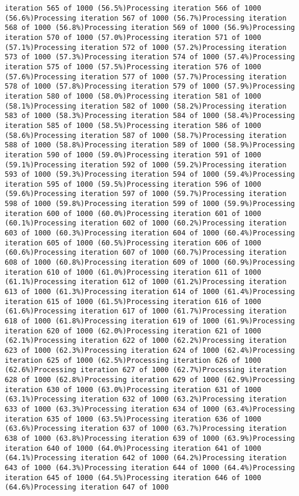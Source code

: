 \documentclass[
]{article}
\begin{document}
\begin{verbatim}
iteration 565 of 1000 (56.5%)Processing iteration 566 of 1000 (56.6%)Processing iteration 567 of 1000 (56.7%)Processing iteration 568 of 1000 (56.8%)Processing iteration 569 of 1000 (56.9%)Processing iteration 570 of 1000 (57.0%)Processing iteration 571 of 1000 (57.1%)Processing iteration 572 of 1000 (57.2%)Processing iteration 573 of 1000 (57.3%)Processing iteration 574 of 1000 (57.4%)Processing iteration 575 of 1000 (57.5%)Processing iteration 576 of 1000 (57.6%)Processing iteration 577 of 1000 (57.7%)Processing iteration 578 of 1000 (57.8%)Processing iteration 579 of 1000 (57.9%)Processing iteration 580 of 1000 (58.0%)Processing iteration 581 of 1000 (58.1%)Processing iteration 582 of 1000 (58.2%)Processing iteration 583 of 1000 (58.3%)Processing iteration 584 of 1000 (58.4%)Processing iteration 585 of 1000 (58.5%)Processing iteration 586 of 1000 (58.6%)Processing iteration 587 of 1000 (58.7%)Processing iteration 588 of 1000 (58.8%)Processing iteration 589 of 1000 (58.9%)Processing iteration 590 of 1000 (59.0%)Processing iteration 591 of 1000 (59.1%)Processing iteration 592 of 1000 (59.2%)Processing iteration 593 of 1000 (59.3%)Processing iteration 594 of 1000 (59.4%)Processing iteration 595 of 1000 (59.5%)Processing iteration 596 of 1000 (59.6%)Processing iteration 597 of 1000 (59.7%)Processing iteration 598 of 1000 (59.8%)Processing iteration 599 of 1000 (59.9%)Processing iteration 600 of 1000 (60.0%)Processing iteration 601 of 1000 (60.1%)Processing iteration 602 of 1000 (60.2%)Processing iteration 603 of 1000 (60.3%)Processing iteration 604 of 1000 (60.4%)Processing iteration 605 of 1000 (60.5%)Processing iteration 606 of 1000 (60.6%)Processing iteration 607 of 1000 (60.7%)Processing iteration 608 of 1000 (60.8%)Processing iteration 609 of 1000 (60.9%)Processing iteration 610 of 1000 (61.0%)Processing iteration 611 of 1000 (61.1%)Processing iteration 612 of 1000 (61.2%)Processing iteration 613 of 1000 (61.3%)Processing iteration 614 of 1000 (61.4%)Processing iteration 615 of 1000 (61.5%)Processing iteration 616 of 1000 (61.6%)Processing iteration 617 of 1000 (61.7%)Processing iteration 618 of 1000 (61.8%)Processing iteration 619 of 1000 (61.9%)Processing iteration 620 of 1000 (62.0%)Processing iteration 621 of 1000 (62.1%)Processing iteration 622 of 1000 (62.2%)Processing iteration 623 of 1000 (62.3%)Processing iteration 624 of 1000 (62.4%)Processing iteration 625 of 1000 (62.5%)Processing iteration 626 of 1000 (62.6%)Processing iteration 627 of 1000 (62.7%)Processing iteration 628 of 1000 (62.8%)Processing iteration 629 of 1000 (62.9%)Processing iteration 630 of 1000 (63.0%)Processing iteration 631 of 1000 (63.1%)Processing iteration 632 of 1000 (63.2%)Processing iteration 633 of 1000 (63.3%)Processing iteration 634 of 1000 (63.4%)Processing iteration 635 of 1000 (63.5%)Processing iteration 636 of 1000 (63.6%)Processing iteration 637 of 1000 (63.7%)Processing iteration 638 of 1000 (63.8%)Processing iteration 639 of 1000 (63.9%)Processing iteration 640 of 1000 (64.0%)Processing iteration 641 of 1000 (64.1%)Processing iteration 642 of 1000 (64.2%)Processing iteration 643 of 1000 (64.3%)Processing iteration 644 of 1000 (64.4%)Processing iteration 645 of 1000 (64.5%)Processing iteration 646 of 1000 (64.6%)Processing iteration 647 of 1000 
\end{verbatim}
\end{document}
